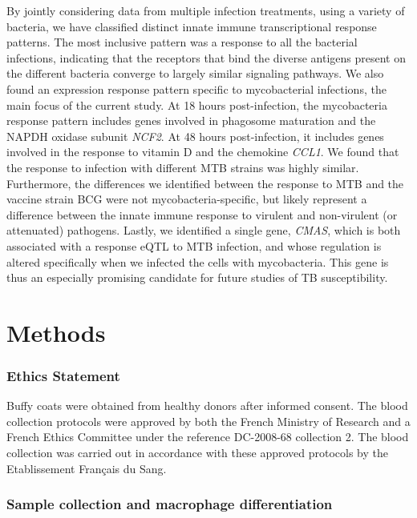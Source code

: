 By jointly considering data from multiple infection treatments, using a
variety of bacteria, we have classified distinct innate immune
transcriptional response patterns. The most inclusive pattern was a
response to all the bacterial infections, indicating that the receptors
that bind the diverse antigens present on the different bacteria
converge to largely similar signaling pathways. We also found an
expression response pattern specific to mycobacterial infections, the
main focus of the current study. At 18 hours post-infection, the
mycobacteria response pattern includes genes involved in phagosome
maturation and the NAPDH oxidase subunit \emph{NCF2}. At 48 hours
post-infection, it includes genes involved in the response to vitamin D
and the chemokine \emph{CCL1}. We found that the response to infection
with different MTB strains was highly similar. Furthermore, the
differences we identified between the response to MTB and the vaccine
strain BCG were not mycobacteria-specific, but likely represent a
difference between the innate immune response to virulent and
non-virulent (or attenuated) pathogens. Lastly, we identified a single
gene, \emph{CMAS}, which is both associated with a response eQTL to MTB
infection, and whose regulation is altered specifically when we infected
the cells with mycobacteria. This gene is thus an especially promising
candidate for future studies of TB susceptibility.

\section{Methods}\label{methods}

\subsubsection{Ethics Statement}\label{ethics-statement}

Buffy coats were obtained from healthy donors after informed consent.
The blood collection protocols were approved by both the French Ministry
of Research and a French Ethics Committee under the reference DC-2008-68
collection 2. The blood collection was carried out in accordance with
these approved protocols by the Etablissement Français du Sang.

\subsubsection{Sample collection and macrophage
differentiation}\label{sample-collection-and-macrophage-differentiation}


